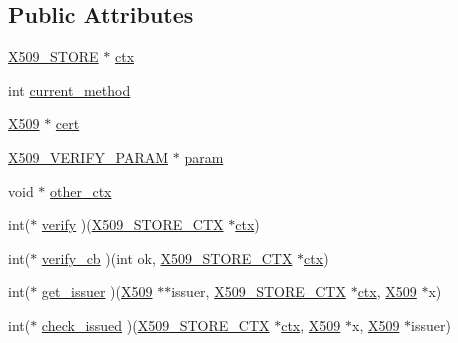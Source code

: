 \subsection*{Public Attributes}
\begin{DoxyCompactItemize}
\item 
\hyperlink{ossl__typ_8h_a3a2b800bae08729d11bc28f12b795597}{X509\+\_\+\+S\+T\+O\+RE} $\ast$ \hyperlink{structx509__store__ctx__st_ac633a0b046f10408d0becf0f1732ede5}{ctx}
\item 
int \hyperlink{structx509__store__ctx__st_a1bbea1b86bcb3d3f1a7d0bb05e67e860}{current\+\_\+method}
\item 
\hyperlink{ossl__typ_8h_a4f666bde6518f95deb3050c54b408416}{X509} $\ast$ \hyperlink{structx509__store__ctx__st_aaf9dd5eda06f69f1a8b9f7606ee5c9b1}{cert}
\item 
\hyperlink{x509__vfy_8h_a9b8209a7a29bafa279e1b5bc5f81cb23}{X509\+\_\+\+V\+E\+R\+I\+F\+Y\+\_\+\+P\+A\+R\+AM} $\ast$ \hyperlink{structx509__store__ctx__st_aacc66808b8d950db3d83395fdcd985b4}{param}
\item 
void $\ast$ \hyperlink{structx509__store__ctx__st_ab5ca1f66ed3e28f30ec7dc4df63ae78d}{other\+\_\+ctx}
\item 
int($\ast$ \hyperlink{structx509__store__ctx__st_a40f028b2c848dc8df554ab89ac562fd1}{verify} )(\hyperlink{ossl__typ_8h_ae681945a2cf88d6337137dc0260a1545}{X509\+\_\+\+S\+T\+O\+R\+E\+\_\+\+C\+TX} $\ast$\hyperlink{structx509__store__ctx__st_ac633a0b046f10408d0becf0f1732ede5}{ctx})
\item 
int($\ast$ \hyperlink{structx509__store__ctx__st_a07d959e3a0cb959ec7c39bd7b8ee76eb}{verify\+\_\+cb} )(int ok, \hyperlink{ossl__typ_8h_ae681945a2cf88d6337137dc0260a1545}{X509\+\_\+\+S\+T\+O\+R\+E\+\_\+\+C\+TX} $\ast$\hyperlink{structx509__store__ctx__st_ac633a0b046f10408d0becf0f1732ede5}{ctx})
\item 
int($\ast$ \hyperlink{structx509__store__ctx__st_a5374f462a245a61de3aa7a7ccf18ddb9}{get\+\_\+issuer} )(\hyperlink{ossl__typ_8h_a4f666bde6518f95deb3050c54b408416}{X509} $\ast$$\ast$issuer, \hyperlink{ossl__typ_8h_ae681945a2cf88d6337137dc0260a1545}{X509\+\_\+\+S\+T\+O\+R\+E\+\_\+\+C\+TX} $\ast$\hyperlink{structx509__store__ctx__st_ac633a0b046f10408d0becf0f1732ede5}{ctx}, \hyperlink{ossl__typ_8h_a4f666bde6518f95deb3050c54b408416}{X509} $\ast$x)
\item 
int($\ast$ \hyperlink{structx509__store__ctx__st_af1c8a974d279ded984821b37c2cd2b4c}{check\+\_\+issued} )(\hyperlink{ossl__typ_8h_ae681945a2cf88d6337137dc0260a1545}{X509\+\_\+\+S\+T\+O\+R\+E\+\_\+\+C\+TX} $\ast$\hyperlink{structx509__store__ctx__st_ac633a0b046f10408d0becf0f1732ede5}{ctx}, \hyperlink{ossl__typ_8h_a4f666bde6518f95deb3050c54b408416}{X509} $\ast$x, \hyperlink{ossl__typ_8h_a4f666bde6518f95deb3050c54b408416}{X509} $\ast$issuer)
$$
\end{DoxyCompactItemize}
